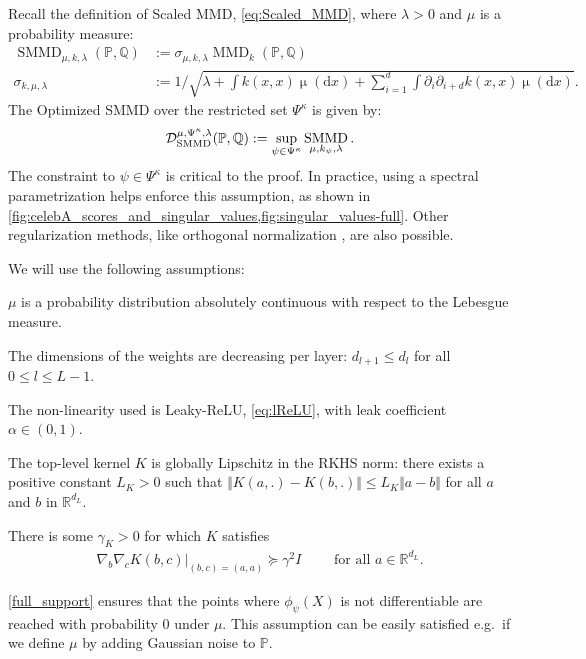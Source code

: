 \documentclass{article}
\newcommand{\ud}{\mathrm d}
\newcommand{\dx}{\ud x}
\newcommand{\mudx}{\operatorname{\mu}(\dx)}
\newcommand{\R}{\mathbb R}
\newcommand{\PP}{\mathbb P}
\newcommand{\QQ}{\mathbb Q}
\DeclareMathOperator{\MMD}{MMD}
\DeclareMathOperator{\SMMD}{SMMD}
\begin{document}
Recall the definition of Scaled MMD, \cref{eq:Scaled_MMD},
where $\lambda > 0$ and $\mu$ is a probability measure:
\begin{align*}
  \SMMD_{\mu,k,\lambda}(\PP,\QQ)
  &:= \sigma_{\mu,k,\lambda} \MMD_k(\PP,\QQ)
\\
  \sigma_{k,\mu,\lambda}
  &:= 1/\sqrt{\lambda + \int k(x,x)\mudx + \sum_{i=1}^d \int \partial_i \partial_{i+d} k(x,x) \mudx}
.\end{align*}
The Optimized SMMD over the restricted set $\Psi^{\kappa}$ is given by:
\[
  \optSMMD[\Psi^\kappa](\PP, \QQ) := \sup_{\psi\in \Psi^\kappa} \SMMD_{\mu,k_{\psi},\lambda}
.\]
The constraint to $\psi \in \Psi^\kappa$ is critical to the proof.
In practice, using a spectral parametrization helps enforce this assumption, as shown in \cref{fig:celebA_scores_and_singular_values,fig:singular_values-full}.
Other regularization methods, like orthogonal normalization \cite{Brock:2016}, are also possible.


We will use the following assumptions:
\begin{assumplist2}
  \item \label{full_support} $\mu$ is a probability distribution absolutely continuous with respect to the Lebesgue measure.
  \item \label{decreasing_dimensions} The dimensions of the weights are decreasing per layer: $d_{l+1}\leq d_{l}$ for all $0\leq l\leq L-1$.
  \item \label{leaky_relu} The non-linearity used is Leaky-ReLU, \eqref{eq:lReLU}, with leak coefficient $\alpha \in (0, 1)$.
  \item \label{Lichitz_kernel} The top-level kernel $K$ is globally Lipschitz in the RKHS norm: there exists a positive constant $L_K>0$ such that $\Vert K(a,.)-K(b,.) \Vert\leq L_K \Vert a-b \Vert $ for all $a$ and $b$ in $\R^{d_L}$.
  \item \label{Convexe_Hessian} There is some $\gamma_K > 0$ for which $K$ satisfies
  \begin{align}
    \nabla_b \nabla_c K(b, c) \bigr\vert_{(b,c) = (a,a)} \succeq \gamma^2 I \qquad \text{ for all } a \in \R^{d_L}.
  \end{align}
\end{assumplist2}

\cref{full_support}
ensures that the points where $\phi_\psi(X)$ is not differentiable
are reached with probability $0$ under $\mu$.
This assumption can be easily satisfied
e.g.\ if we define $\mu$ by adding Gaussian noise to $\PP$.
\end{document}
